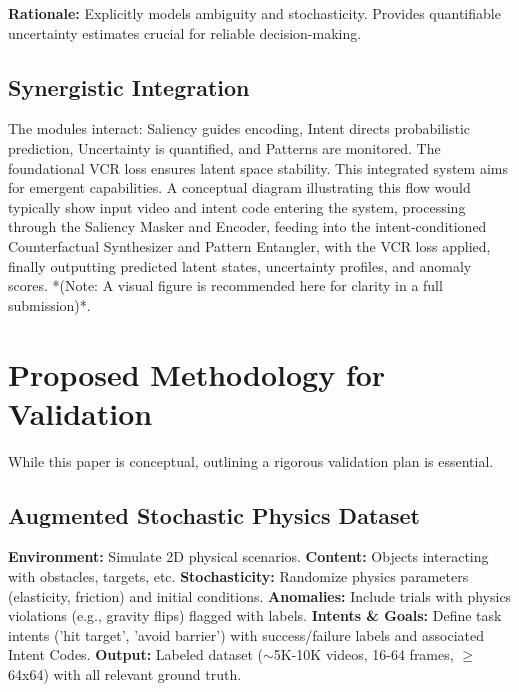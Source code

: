 \documentclass[11pt]{article}
\begin{document}
\textbf{Rationale:} Explicitly models ambiguity and stochasticity. Provides quantifiable uncertainty estimates crucial for reliable decision-making.

\subsection{Synergistic Integration}
The modules interact: Saliency guides encoding, Intent directs probabilistic prediction, Uncertainty is quantified, and Patterns are monitored. The foundational VCR loss ensures latent space stability. This integrated system aims for emergent capabilities. A conceptual diagram illustrating this flow would typically show input video and intent code entering the system, processing through the Saliency Masker and Encoder, feeding into the intent-conditioned Counterfactual Synthesizer and Pattern Entangler, with the VCR loss applied, finally outputting predicted latent states, uncertainty profiles, and anomaly scores. *(Note: A visual figure is recommended here for clarity in a full submission)*.

\section{Proposed Methodology for Validation}
\label{sec:methodology}
While this paper is conceptual, outlining a rigorous validation plan is essential.

\subsection{Augmented Stochastic Physics Dataset}
\textbf{Environment:} Simulate 2D physical scenarios.
\textbf{Content:} Objects interacting with obstacles, targets, etc.
\textbf{Stochasticity:} Randomize physics parameters (elasticity, friction) and initial conditions.
\textbf{Anomalies:} Include trials with physics violations (e.g., gravity flips) flagged with labels.
\textbf{Intents & Goals:} Define task intents ('hit target', 'avoid barrier') with success/failure labels and associated Intent Codes.
\textbf{Output:} Labeled dataset ($\sim$5K-10K videos, 16-64 frames, $\ge$64x64) with all relevant ground truth.
\end{document}
